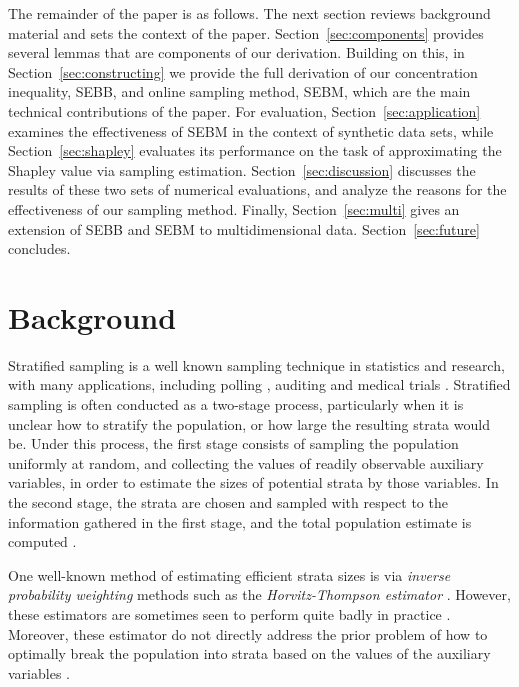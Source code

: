 \documentclass[]{interact}
\theoremstyle{plain}%
\theoremstyle{definition}
\theoremstyle{remark}
\begin{document}
The remainder of the paper is as follows.
The next section reviews background material and sets the context of the paper. 
Section~\ref{sec:components} provides several lemmas that are components of our derivation. Building on this, in Section~\ref{sec:constructing} we provide the full derivation of our concentration inequality, SEBB, and online sampling method, SEBM, which are the main technical contributions of the paper. 
For evaluation, Section~\ref{sec:application} examines the effectiveness of SEBM in the context of synthetic data sets, 
while Section~\ref{sec:shapley} evaluates its performance on the task of approximating the Shapley value via sampling estimation.
Section~\ref{sec:discussion} discusses the results of these two sets of numerical evaluations, and analyze the reasons for the effectiveness of our sampling method.
Finally, Section~\ref{sec:multi} gives an extension of SEBB and SEBM to multidimensional data.  
Section~\ref{sec:future} concludes.


\section{Background}\label{sec:background}

Stratified sampling is a well known sampling technique in statistics and research, with many applications, including polling \cite{2015PLoSO..1032850H}, auditing \cite{Stark:2009:RPA:1720420.1720456,Miratrix:2009:EAU:1720420.1720453} and medical trials \cite{f7d2c1e6d03c463383ba9f702c3b4dac,doi:10.1093/biomet/73.1.1,Borgan2000}.
Stratified sampling is often conducted as a two-stage process, 
particularly when it is unclear how to stratify the population, or how large the resulting strata would be.
Under this process, the first stage consists of sampling the population uniformly at random, and collecting the values of readily observable auxiliary variables, in order to estimate the sizes of potential strata by those variables.
In the second stage, the strata are chosen and sampled with respect to the information gathered in the first stage, and the total population estimate is computed \cite{LEGG200955}.

One well-known method of estimating efficient strata sizes is via \textit{inverse probability weighting} methods such as the \textit{Horvitz-Thompson estimator} \cite{10.2307/2280784}. 
However, these estimators are sometimes seen to perform quite badly in practice \cite{saegusa2013,Breslow2015}. 
Moreover, these estimator do not directly address the prior problem of how to optimally break the population into strata based on the values of the auxiliary variables  \cite{2015PLoSO..1032850H,DBLP:journals/jmma/KhanAK09,CIS-196251}.
\end{document}
